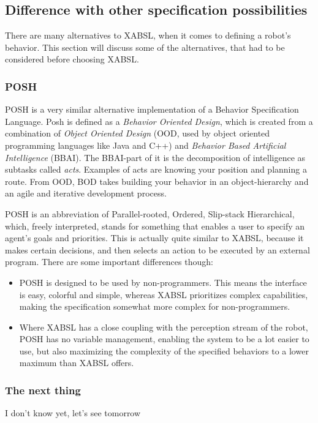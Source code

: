 \documentclass[a4paper,10pt]{article}
\begin{document}
\subsection{Difference with other specification possibilities}
There are many alternatives to XABSL, when it comes to defining a robot's
behavior. This section will discuss some of the alternatives, that had to be
considered before choosing XABSL.

\subsubsection{POSH}
POSH \cite{brom2006posh} is a very similar alternative implementation of a Behavior Specification
Language. Posh is defined as a \textit{Behavior Oriented Design}, which is
created from a combination of \textit{Object Oriented Design} (OOD, used by object oriented
programming languages like Java and C++) and \textit{Behavior Based Artificial
Intelligence} (BBAI). The BBAI-part of it is the decomposition of intelligence
as subtasks called \textit{acts}. Examples of acts are knowing your position and
planning a route. From OOD, BOD takes building your behavior in an object-hierarchy
and an agile and iterative development process.

POSH is an abbreviation of Parallel-rooted, Ordered, Slip-stack Hierarchical,
which, freely interpreted, stands for something that enables a user to specify
an agent's goals and priorities. This is actually quite similar to XABSL,
because it makes certain decisions, and then selects an action to be executed by
an external program. There are some important differences though:

\begin{itemize}
    \item POSH is designed to be used by non-pro\-gram\-mers. This means the
    interface is easy, colorful and simple, whereas XABSL prioritizes complex
    capabilities, making the specification somewhat more complex for
    non-programmers.
    \item Where XABSL has a close coupling with the perception stream of the
    robot, POSH has no variable management, enabling the system to be a lot
    easier to use, but also maximizing the complexity of the specified behaviors
    to a lower maximum than XABSL offers.
\end{itemize}

\subsubsection{The next thing}
I don't know yet, let's see tomorrow
\end{document}
